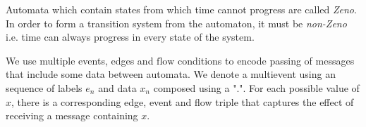 \begin{comment}
For example, when we define our train control system it is desired that the S of the train is $0$, initially and that remains invariant throughout execution of the automaton $init(Stopped) := invar(Stopped) := S = 0$ , which is captured by the initial predicate $init(Stopped) := S = 0$.  It is also desirable in the states Accelerating and Full Speed that the braking distance is less than or equal to the distance between the train and the end of movement authority $inv(Acc) := inv(Full Speed) := BD(S) \leq DMA(D, EoA)$. The invariant acts as a boundary condition which specifies the limits of the automatons behaviour. In the case of the Full Speed and Accelerating states it ensures that the train can always brake in time and it forces the automaton to perform a transition to the braking state when the boundary of the invariant is reached . If some some reason the system flows into one of these boundaries and no discrete change can occur then time is prevented from continuing.  \end{comment}

Automata which contain states from which time cannot progress are called \emph{Zeno}. In order to form a transition system from the automaton, it must be \emph{non-Zeno} i.e. time can always progress in every state of the system. 
\medskip
\begin{comment}
 In the following specification events are used to pass messages between different automata placed in parallel. An example event is that of $event(Stopped \to Accelerating) :=MA.x.y \ \textbf{if} \ x = TrainID \ \textbf{then} \ EoA' := y$ which is triggered by the RBC and causes the train to update the value of its movement authority. flow conditions describe the rate of change of a given variable over time. In our formalisation of a train one such flow condition is $flow(Accelerating) := \dot{S} = 1$ which causes the train to accelerate at a S of one unit per unit of time.
\end{comment}

\begin{myremark}
We use multiple events, edges and $\mathrm{flow}$ conditions to encode passing of messages that include some data between automata.  We denote a multievent using an sequence of labels $e_n$ and data $x_n$ composed using a ".".  For each possible value of $x$, there is a corresponding edge, event and flow triple that captures the effect of receiving a message containing $x$.
\end{myremark}

